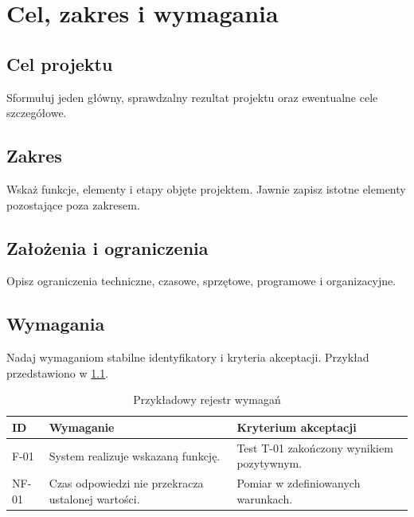 \chapter{Cel, zakres i wymagania}
\label{chap:cel-wymagania}

\section{Cel projektu}
Sformułuj jeden główny, sprawdzalny rezultat projektu oraz ewentualne cele szczegółowe.

\section{Zakres}
Wskaż funkcje, elementy i etapy objęte projektem. Jawnie zapisz istotne elementy pozostające poza zakresem.

\section{Założenia i ograniczenia}
Opisz ograniczenia techniczne, czasowe, sprzętowe, programowe i organizacyjne.

\section{Wymagania}
Nadaj wymaganiom stabilne identyfikatory i kryteria akceptacji. Przykład przedstawiono w \cref{tab:wymagania}.

\begin{table}[htbp]
  \centering
  \caption{Przykładowy rejestr wymagań}
  \label{tab:wymagania}
  \begin{tabularx}{\textwidth}{@{}p{1.5cm}X X@{}}
    \toprule
    ID & Wymaganie & Kryterium akceptacji \\
    \midrule
    F-01 & System realizuje wskazaną funkcję. & Test T-01 zakończony wynikiem pozytywnym. \\
    NF-01 & Czas odpowiedzi nie przekracza ustalonej wartości. & Pomiar w zdefiniowanych warunkach. \\
    \bottomrule
  \end{tabularx}
\end{table}
